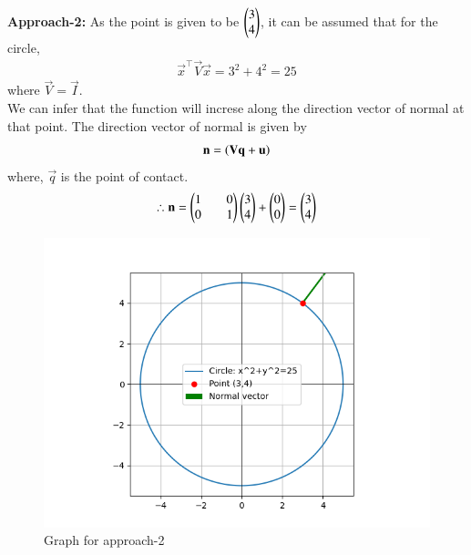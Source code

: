 \documentclass[journal]{IEEEtran}
\begin{document}
\textbf{Approach-2: }As the point is given to be $\begin{pmatrix}3\\4\end{pmatrix}$, it can be assumed that for the circle,
\begin{align}
    \vec{x}^{\top}\vec{V}\vec{x}=3^2+4^2=25 \label{eq:1}
\end{align}
where $\vec{V}=\vec{I}$.\\
We can infer that the function will increse along the direction vector of normal at that point.
The direction vector of normal is given by
\begin{align}
    \mathbf{n}=\left(\mathbf{V}\mathbf{q}+\mathbf{u}\right)
\end{align}
where, $\vec{q}$ is the point of contact.
\begin{align}
    \therefore \mathbf{n}=\begin{pmatrix}1&&0\\0&&1\end{pmatrix}\begin{pmatrix}3\\4\end{pmatrix}+\begin{pmatrix}0\\0\end{pmatrix}=\begin{pmatrix}3\\4\end{pmatrix}
\end{align}

\newpage
\vspace*{0.25cm}

\begin{figure}[H]
    \centering
    \includegraphics[width=0.7\columnwidth]{figs/Figure_2.png}
    \caption{Graph for approach-2}
    \label{fig:2}
\end{figure}
\end{document}
